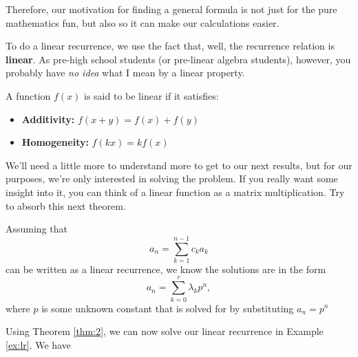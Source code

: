 Therefore, our motivation for finding a general formula is not just for the pure mathematics fun, but also so it can make our calculations easier. 

To do a linear recurrence, we use the fact that, well, the recurrence relation is \textbf{linear}. As pre-high school students (or pre-linear algebra students), however, you probably have \textit{no idea} what I mean by a linear property. 

\begin{theorem}
A function $f(x)$ is said to be linear if it satisfies:
\begin{itemize}
    \item \textbf{Additivity:} $f(x+y) = f(x)+f(y)$
    \item \textbf{Homogeneity:} $f(kx) = kf(x)$
\end{itemize}
\end{theorem}

We'll need a little more to understand more to get to our next results, but for our purposes, we're only interested in solving the problem. If you really want some insight into it, you can think of a linear function as a matrix multiplication. Try to absorb this next theorem.

\begin{theorem}
Assuming that  
\begin{equation*}
    a_n = \sum\limits_{k=1}^{n-1} c_{k}a_{k}
\end{equation*}
can be written as a linear recurrence, we know the solutions are in the form
$$a_n = \sum\limits_{k=0}^{r} \lambda_k p^n,$$
where $p$ is some unknown constant that is solved for by substituting $a_n = p^n$
\label{thm:2}
\end{theorem}

Using Theorem \ref{thm:2}, we can now solve our linear recurrence in Example \ref{ex:lr}. We have 

